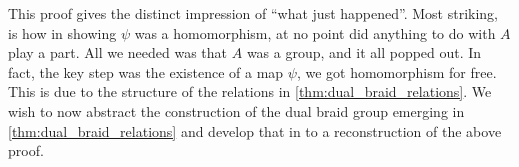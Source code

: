 This proof gives the distinct impression of ``what just happened''.
Most striking, is how in showing $\psi$ was a homomorphism, at no point did anything to do with $A$ play a part.
All we needed was that $A$ was a group, and it all popped out.
In fact, the key step was the existence of a map $\psi$, we got homomorphism for free.
This is due to the structure of the relations in \cref{thm:dual_braid_relations}.
We wish to now abstract the construction of the dual braid group emerging in \cref{thm:dual_braid_relations} and develop that in to a reconstruction of the above proof.


